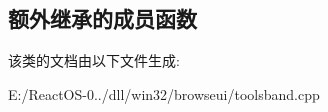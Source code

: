 \subsection*{额外继承的成员函数}


该类的文档由以下文件生成\+:\begin{DoxyCompactItemize}
\item 
E\+:/\+React\+O\+S-\/0../dll/win32/browseui/toolsband.\+cpp\end{DoxyCompactItemize}
